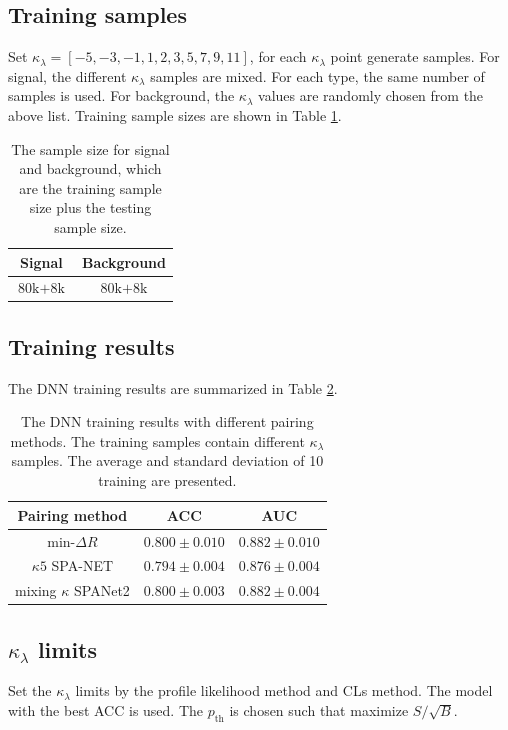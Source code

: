 \documentclass[12pt]{article}
\begin{document}
	\subsection{Training samples}%
	\label{sub:training_samples2}
	Set $\kappa_\lambda = [-5, -3, -1, 1, 2, 3, 5, 7, 9, 11]$, for each $\kappa_\lambda$ point generate samples. For signal, the different $\kappa_\lambda$ samples are mixed. For each type, the same number of samples is used. For background, the $\kappa_\lambda$ values are randomly chosen from the above list. Training sample sizes are shown in Table \ref{tab:DNN_sample_size3}.
		\begin{table}[htpb]
			\centering
			\caption{The sample size for signal and background, which are the training sample size plus the testing sample size.}
			\label{tab:DNN_sample_size3}
			\begin{tabular}{c|c}
			 Signal & Background\\ \hline
			 $\text{80k} + \text{8k}$      &$\text{80k} + \text{8k}$ 
			\end{tabular}
		\end{table}

	\subsection{Training results}%
	\label{sub:training_results}
		The DNN training results are summarized in Table \ref{tab:DNN_results}.
		\begin{table}[htpb]
			\centering
			\caption{The DNN training results with different pairing methods. The training samples contain different $\kappa_\lambda$ samples. The average and standard deviation of 10 training are presented.}
			\label{tab:DNN_results}
			\begin{tabular}{c|cc}
			Pairing method        & ACC     & AUC   \\ \hline
			$\text{min-}\Delta R$ & $0.800 \pm 0.010$ & $0.882 \pm 0.010$ \\
			$\kappa 5$ SPA-NET    & $0.794 \pm 0.004$ & $0.876 \pm 0.004$ \\
			mixing $\kappa$ SPANet2 & $0.800 \pm 0.003$ & $0.882 \pm 0.004$ \\
			\end{tabular}      
		\end{table}
	
	\subsection{\texorpdfstring{$\kappa_\lambda$}{kappa} limits}%
	\label{sub:kappa_limits}
		Set the $\kappa_\lambda$ limits by the profile likelihood method and CLs method. The model with the best ACC is used. The $p_\text{th}$ is chosen such that maximize $S / \sqrt{B}$.
\end{document}

